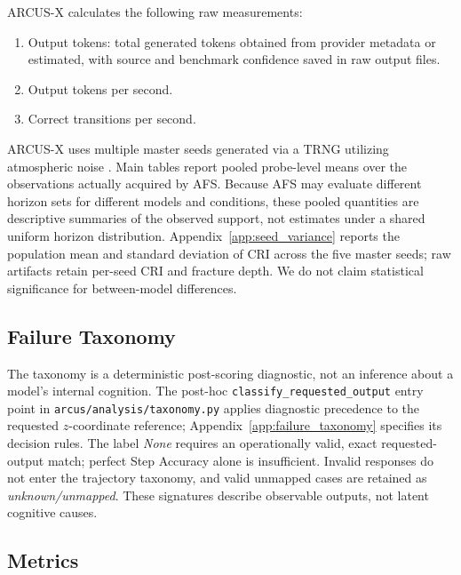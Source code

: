 \documentclass{article}
\begin{document}
ARCUS-X calculates the following raw measurements:
\begin{enumerate}
    \item Output tokens: total generated tokens obtained from provider metadata or estimated, with source and benchmark confidence saved in raw output files.
    \item Output tokens per second.
    \item Correct transitions per second.
\end{enumerate}

ARCUS-X uses multiple master seeds generated via a TRNG utilizing atmospheric noise \cite{haahr_random_org}. Main tables report pooled probe-level means over the observations actually acquired by AFS. Because AFS may evaluate different horizon sets for different models and conditions, these pooled quantities are descriptive summaries of the observed support, not estimates under a shared uniform horizon distribution. Appendix~\ref{app:seed_variance} reports the population mean and standard deviation of CRI across the five master seeds; raw artifacts retain per-seed CRI and fracture depth. We do not claim statistical significance for between-model differences.

\subsection{Failure Taxonomy}
\label{subsec:failure_taxonomy}
The taxonomy is a deterministic post-scoring diagnostic, not an inference about a model's internal cognition. The post-hoc \texttt{classify\_requested\_output} entry point in \texttt{arcus/analysis/taxonomy.py} applies diagnostic precedence to the requested $z$-coordinate reference; Appendix~\ref{app:failure_taxonomy} specifies its decision rules. The label \emph{None} requires an operationally valid, exact requested-output match; perfect Step Accuracy alone is insufficient. Invalid responses do not enter the trajectory taxonomy, and valid unmapped cases are retained as \emph{unknown/unmapped}. These signatures describe observable outputs, not latent cognitive causes.

\subsection{Metrics}
\label{subsec:Metrics}
\end{document}
